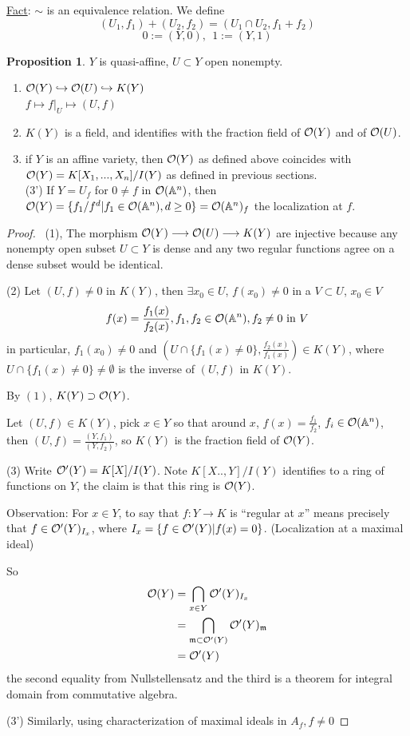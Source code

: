 \documentclass[11pt]{article}
\theoremstyle{definition}
\newtheorem{prop}[thm]{Proposition}
\newcommand{\affn}{\mathbb A}
\newcommand{\scm}{{\mathfrak m}}
\newcommand{\calo}{{\cal O}}
\newcommand{\lrta}{\longrightarrow}
\newcommand{\inj}{\hookrightarrow}
\begin{document}
\underline{Fact}: $\sim$ is an equivalence relation. We define
$$
(U_1,f_1)+(U_2,f_2)=(U_1\cap U_2,f_1+f_2)
$$
$$
0:=(Y,0),\ \ 1:=(Y,1)
$$
\begin{prop}
$Y$ is quasi-affine, $U\subset Y$ open nonempty.
\begin{enumerate}[label=(\arabic*)]
\item $\calo(Y)\inj\calo(U)\inj K(Y)$\\
$f\longmapsto f|_U\mapsto (U,f)$
\item $K(Y)$ is a field, and identifies with the fraction field of $\calo(Y)$ and of $\calo(U)$.
\item if $Y$ is an affine variety, then $\calo(Y)$ as defined above coincides with $\calo(Y)=K[X_1,...,X_n]/I(Y)$ as defined in previous sections.\\

(3') If $Y=U_f$ for $0\neq f$ in $\calo(\affn^n)$, then $\calo(Y)=\{f_1/f^d|f_1\in \calo(\affn^n), d\geq 0\}=\calo(\affn^n)_f$ the localization at $f$.
\end{enumerate}
\end{prop}
\begin{proof}\ 
(1), The morphism $\calo(Y)\lrta \calo(U)\lrta K(Y)$ are injective because any nonempty open subset $U\subset Y$ is dense and any two regular functions agree on a dense subset would be identical.

(2) Let $(U,f)\neq 0$ in $K(Y)$, then $\exists x_0\in U$, $f(x_0)\neq 0$ in a $V\subset U$, $x_0\in V$
$$
f(x)=\frac{f_1(x)}{f_2(x)}, f_1,f_2\in\calo(\affn^n), f_2\neq 0\text{ in }V
$$
in particular, $f_1(x_0)\neq 0$ and $( U\cap\{f_1(x)\neq 0\},\frac{f_2(x)}{f_1(x)})\in K(Y)$, where $U\cap\{f_1(x)\neq 0\}\neq \emptyset$ is the inverse of $(U,f)$ in $K(Y)$. 

By $(1)$, $K(Y)\supset \calo(Y)$.

Let $(U,f)\in K(Y)$, pick $x\in Y$ so that around $x$, $f(x)=\frac{f_1}{f_2}$, $f_i\in\calo(\affn^n)$, then $(U,f)=\frac{(Y,f_1)}{(Y,f_2)}$, so $K(Y)$ is the fraction field of $\calo(Y)$.

(3) Write $\calo'(Y)=K[X]/I(Y)$.  Note $K[X..,Y]/I(Y)$ identifies to a ring of functions on $Y$, the claim is that this ring is $\calo(Y)$.

Observation:
For $x\in Y$, to say that $f: Y\lrta K$ is ``regular at $x$'' means precisely that $f\in \calo'(Y)_{I_x}$, where $I_x=\{f\in\calo'(Y)|f(x)=0\}$. (Localization at  a maximal ideal)

So $$
\begin{aligned}
\calo(Y)&=\bigcap_{x\in Y}\calo'(Y)_{I_x}\\
&=\bigcap_{\scm\subset\calo'(Y)}\calo'(Y)_\scm\\
&=\calo'(Y)
\end{aligned}
$$
the second equality from Nullstellensatz and the third is a theorem for integral domain from commutative algebra.

(3') Similarly, using characterization of maximal ideals in $A_f, f\neq 0$
\end{proof}
\end{document}
